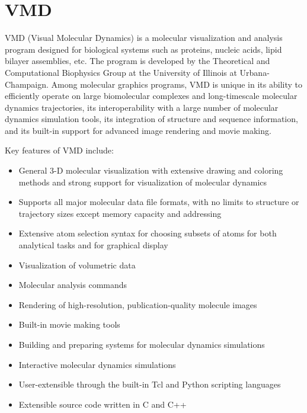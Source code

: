 \section{VMD}
VMD (Visual Molecular Dynamics) is a molecular visualization and analysis program designed for biological systems such as proteins, nucleic acids, lipid bilayer assemblies, etc. The program is developed by the Theoretical and Computational Biophysics Group at the University of Illinois at Urbana-Champaign. Among molecular graphics programs, VMD is unique in its ability to efficiently operate on large biomolecular complexes and long-timescale molecular dynamics trajectories, its interoperability with a large number of molecular dynamics simulation tools, its integration of structure and sequence information, and its built-in support for advanced image rendering and movie making.

Key features of VMD include:
\begin{itemize}
\item General 3-D molecular visualization with extensive drawing and coloring methods and strong support for visualization of molecular dynamics
\item Supports all major molecular data file formats, with no limits to structure or trajectory sizes except memory capacity and addressing
\item Extensive atom selection syntax for choosing subsets of atoms for both analytical tasks and for graphical display
\item Visualization of volumetric data
\item Molecular analysis commands
\item Rendering of high-resolution, publication-quality molecule images
\item Built-in movie making tools
\item Building and preparing systems for molecular dynamics simulations
\item Interactive molecular dynamics simulations
\item User-extensible through the built-in Tcl and Python scripting languages
\item Extensible source code written in C and C++
\end{itemize}